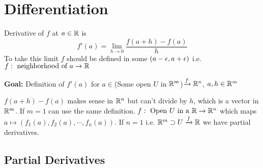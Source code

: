 \chapter{Differentiation }
Derivative of $f$ at $a\in \mathbb{R}$ is $$f'(a)=\lim_{h\to 0} \frac{f(a+h)-f(a)}{h}$$To take this limit $f$ should be defined in some $(a-\epsilon,a+\epsilon)$ i.e. $f:\text{ neighborhood of }a\to\mathbb{R}$\parinf

\textbf{Goal:} Definition of $f'(a)$ for $a\in $(Some open $U$ in $\mathbb{R}^m$)$\xrightarrow{f}\mathbb{R}^n$, $a,h\in\mathbb{R}^m$\parinn

$f(a+h)-f(a)$ makes sense in $\mathbb{R}^n$ but can't divide by $h$, which is a vector in $\mathbb{R}^m$. If $m=1$ can use the same definition. ${f:\text{ Open }U\text{ in a }\mathbb{R}\to\mathbb{R}^n}$ which maps $a\mapsto(f_1(a),f_2(a),\cdots,f_n(a))$. If $n=1$ i.e. $\mathbb{R}^m\supset U\xrightarrow{f}\mathbb{R}$  we have partial derivatives.
\section{Partial Derivatives}

